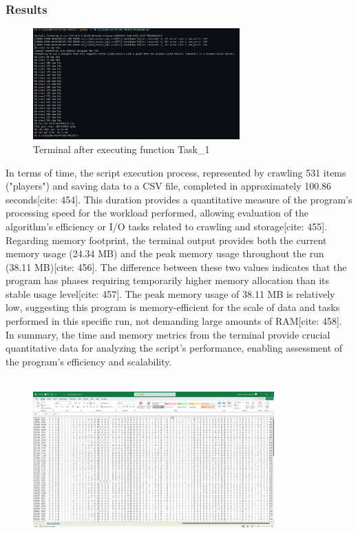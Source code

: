\documentclass[12pt]{report}
\begin{document}
{{{\subsubsection{Results}
\begin{figure}[h]
    \centering
    \includegraphics[width=300px]{Terminal_4.png}
    \caption{Terminal after executing function Task\_1}
    \label{fig:res2}
\end{figure}
In terms of time, the script execution process, represented by crawling 531 items ("players") and saving data to a CSV file, completed in approximately 100.86 seconds[cite: 454]. This duration provides a quantitative measure of the program's processing speed for the workload performed, allowing evaluation of the algorithm's efficiency or I/O tasks related to crawling and storage[cite: 455]. Regarding memory footprint, the terminal output provides both the current memory usage (24.34 MB) and the peak memory usage throughout the run (38.11 MB)[cite: 456]. The difference between these two values indicates that the program has phases requiring temporarily higher memory allocation than its stable usage level[cite: 457]. The peak memory usage of 38.11 MB is relatively low, suggesting this program is memory-efficient for the scale of data and tasks performed in this specific run, not demanding large amounts of RAM[cite: 458]. In summary, the time and memory metrics from the terminal provide crucial quantitative data for analyzing the script's performance, enabling assessment of the program's efficiency and scalability.\\\\
\begin{figure}[h]
    \centering
    \includegraphics[width=350px]{P4_RES.png}

\end{figure}}}}
\end{document}
